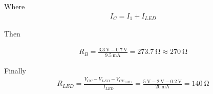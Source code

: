 \documentclass[12pt]{article}
\begin{document}
Where
\begin{align}
	I_C= I_1 + I_{LED}
\end{align}

Then

\begin{align}
	R_B = \frac{\qty{3.3}{\volt} - \qty{0.7}{\volt}}{\qty{9.5}{\milli \ampere}} = \qty{273.7}{\ohm} \approx \qty{270}{\ohm}
\end{align}

Finally
\begin{align}
	R_{LED} = \frac{V_{CC} - V_{LED} - V_{CE_{(sat)}}}{I_{LED}} = \frac{ \qty{5}{\volt} - \qty{2}{\volt} - \qty{0.2}{\volt} }{ \qty{20}{\milli \ampere} } = \qty{140}{\ohm}
\end{align}
\end{document}
